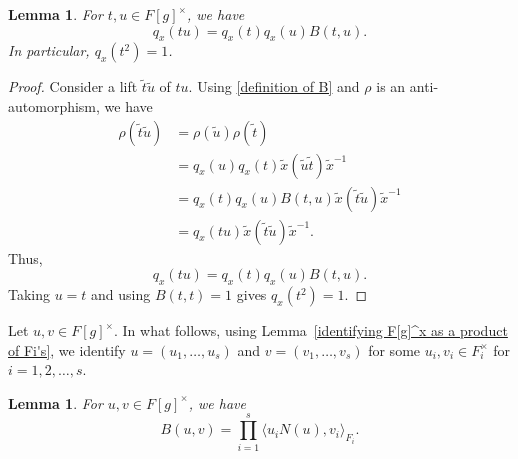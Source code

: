 \documentclass[11pt, a4paper, reqno]{amsart}
\newtheorem{lemma}[theorem]{Lemma}
\theoremstyle{definition}
\theoremstyle{remark}
\theoremstyle{example}
\theoremstyle{note}
\numberwithin{equation}{section}
\begin{document}
\begin{lemma}\label{lem:quadratic-q} For $t,u\in F[g]^{\times}$, we have
\begin{equation*}
q_x(tu)=q_x(t)q_x(u)B(t,u).
\end{equation*}
In particular, $q_{x}(t^{2})=1$.
\end{lemma}

\begin{proof}
Consider a lift $\tilde{t}\tilde{u}$ of $tu$. Using \eqref{definition of B} and $\rho$ is an anti-automorphism,  we have 
\begin{align*}
\rho(\tilde{t}\tilde{u})
&=\rho(\tilde{u})\rho(\tilde{t})\\
&=q_{x}(u)q_{x}(t)\tilde{x}
(\tilde{u}\tilde{t})\tilde{x}^{-1}\\
&= q_{x}(t)q_{x}(u)B(t,u)
\tilde{x}(\tilde{t}\tilde{u})\tilde{x}^{-1}\\
&= q_{x}(tu)\tilde{x}(\tilde{t}\tilde{u})\tilde{x}^{-1}.
\end{align*}
Thus, 
\[q_x(tu)=q_x(t)q_x(u)B(t,u).\]
Taking $u=t$ and using $B(t,t)=1$ gives $q_{x}(t^{2})=1$. 
\end{proof}

Let $u,v \in F[g]^{\times}$. In what follows, using Lemma~\ref{identifying F[g]^x as a product of Fi's}, we identify $u=(u_{1},\ldots,u_{s})$ and $v=(v_{1},\ldots,v_{s})$ for some $u_{i}, v_{i}\in F_{i}^{\times}$ for $i=1, 2, \dots, s$. 



\begin{lemma}\label{description of B using norm} For $u, v \in F[g]^{\times}$, we have 
\[B(u,v) =\prod_{i=1}^{s}\bigl\langle u_iN(u),v_i\bigr\rangle_{F_i}.\]
\end{lemma}
\end{document}
